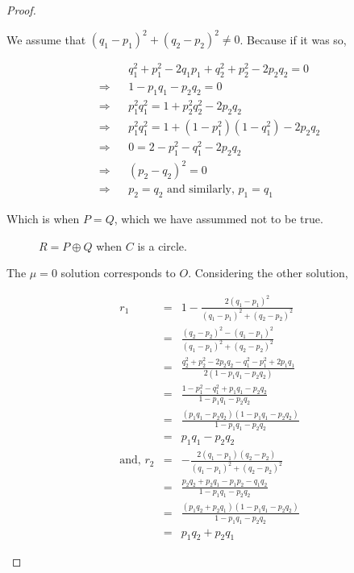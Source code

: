 \begin{proof}
\begin{itemize}
{        We assume that $(q_1-p_1)^2+(q_2-p_2)^2\ne0$. Because if it was so,

        \begin{eqnarray*}
          &&q_1^2+p_1^2-2q_1p_1+q_2^2+p_2^2-2p_2q_2=0\\
          \Longrightarrow&& 1-p_1q_1-p_2q_2=0\\
          \Longrightarrow&& p_1^2q_1^2=1+p_2^2q_2^2-2p_2q_2\\
          \Longrightarrow&& p_1^2q_1^2=1+(1-p_1^2)(1-q_1^2)-2p_2q_2\\
          \Longrightarrow&& 0=2-p_1^2-q_1^2-2p_2q_2\\
          \Longrightarrow&& (p_2-q_2)^2=0\\
          \Longrightarrow&& p_2=q_2\text{ and similarly, }p_1=q_1
        \end{eqnarray*}

        Which is when $P=Q$, which we have assummed not to be true.

        \begin{figure}[H]
          \center
          \caption{$R = P \oplus Q$ when $C$ is a circle.}
        \end{figure}

        The $\mu=0$ solution corresponds to $O$. Considering the other solution,

        \begin{eqnarray*}
          r_1&=& 1-\frac{2(q_1-p_1)^2}{(q_1-p_1)^2+(q_2-p_2)^2}\\
             &=& \frac{(q_2-p_2)^2-(q_1-p_1)^2}{(q_1-p_1)^2+(q_2-p_2)^2}\\
             &=& \frac{q_2^2+p_2^2-2p_2q_2-q_1^2-p_1^2+2p_1q_1}{2(1-p_1q_1-p_2q_2)}\\
             &=& \frac{1-p_1^2-q_1^2+p_1q_1-p_2q_2}{1-p_1q_1-p_2q_2}\\
             &=& \frac{(p_1q_1-p_2q_2)(1-p_1q_1-p_2q_2)}{1-p_1q_1-p_2q_2}\\
             &=& p_1q_1-p_2q_2\\
          \text{and, }
          r_2&=& -\frac{2(q_1-p_1)(q_2-p_2)}{(q_1-p_1)^2+(q_2-p_2)^2}\\
             &=& \frac{p_2q_2+p_2q_1-p_1p_2-q_1q_2}{1-p_1q_1-p_2q_2}\\
             &=& \frac{(p_1q_2+p_2q_1)(1-p_1q_1-p_2q_2)}{1-p_1q_1-p_2q_2}\\
             &=& p_1q_2+p_2q_1
        \end{eqnarray*}

}
\end{itemize}
\end{proof}
